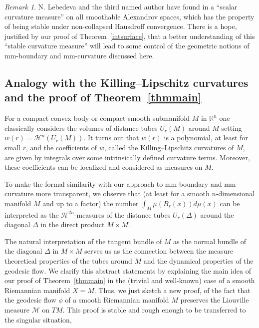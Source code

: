 \documentclass[12pt,leqno]{amsart}
\numberwithin{equation}{section}
\theoremstyle{definition}
\theoremstyle{remark}
\newtheorem{rem}[thm]{Remark}
\newcommand{\tref}[1]{Theorem~\ref{#1}}
\newcommand{\R}{\mathbb{R}}
\def\:{\colon}
\begin{document}
\begin{rem}
N. Lebedeva and the third named author have found in \cite{LP}  a ``scalar curvature measure'' on all smoothable Alexandrov spaces, which has the property of being stable
under non-collapsed Hausdroff convergence. There is a hope, justified by our proof of  \tref{intsurface}, that a better understanding of this ``stable curvature measure'' will
lead to some control of the geometric notions of mm-boundary and mm-curvature discussed here.
\end{rem}



\subsection{Analogy with the Killing--Lipschitz curvatures and the proof of \tref{thmmain}}
For a compact convex body or compact smooth submanifold $M$ in $\R^n$ one classically considers
the  volumes of distance tubes $U_r(M)$ around $M$ setting $w(r)=\mathcal H^n (U_r(M))$.
It turns out that $w(r)$ is a polynomial, at least for small $r$, and  the coefficients of
$w$, called the   Killing--Lipschitz curvatures of $M$, are given by  integrals over some intrinsically defined curvature
 terms.  Moreover, these coefficients can be localized and considered as measures on $M$.

To make the formal similarity with our approach  to mm-boundary and mm-curvature more transparent, we observe that
(at least for a smooth $n$-dimensional manifold $M$ and up to a factor) the number   $\int _M \mu (B_r(x)) d\mu (x)$  can be interpreted as the $\mathcal H^{2n}$-measures
of the distance tubes $U_r(\Delta )$ around the diagonal $\Delta $ in the direct product $M\times M$.

The natural interpretation of the tangent bundle of $M$ as the normal  bundle of the diagonal $\Delta$ in $M\times M$ serves us as the connection between
the measure theoretical properties of the tubes around $M$ and the dynamical properties of the geodesic flow.
We clarify this abstract statements by explaining the main idea of  our  proof of \tref{thmmain} in the (trivial and well-known) case of a smooth Riemannian manifold $X=M$. 
Thus, we just sketch a new proof,  of the fact   that the geodesic flow $\phi$ of a smooth Riemannian manifold $M$ preserves the Liouville measure $\mathcal M$ on $TM$.
This proof is stable and rough enough to be transferred to the singular situation,
\end{document}
